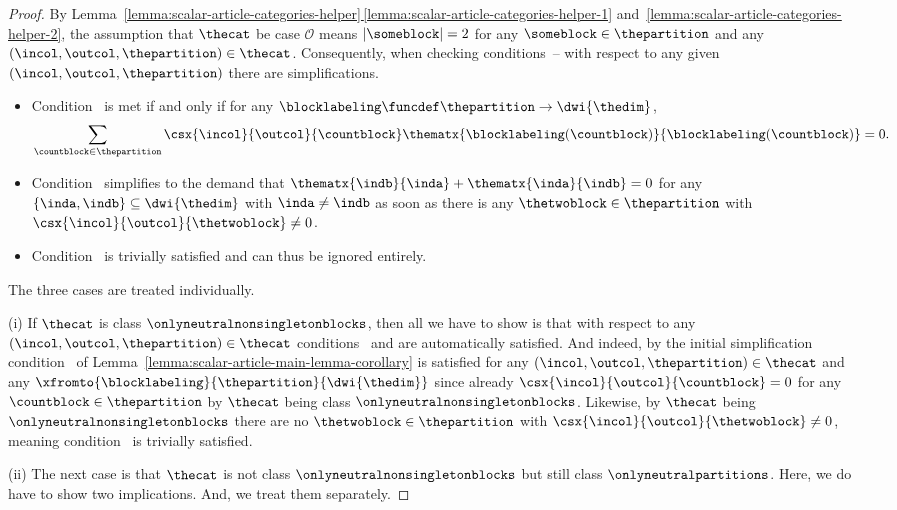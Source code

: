 \documentclass[pdftex]{sigma}
\numberwithin{equation}{section}
\begin{document}
{\begin{proof}
  By Lem\-ma~\hyperref[lemma:scalar-article-categories-helper-1]{\ref*{lemma:scalar-article-categories-helper}\,\ref*{lemma:scalar-article-categories-helper-1}} and~\ref{lemma:scalar-article-categories-helper-2}, the assumption that $\thecat$ be case $\mathcal{O}$  means $|\someblock|=2$ for any $\someblock\in\thepartition$ and any $(\incol,\outcol,\thepartition)\in\thecat$. Consequently, when checking  conditions~\conditionone{}--\conditionthree{} with respect to any given $(\incol,\outcol,\thepartition)$ there are simplifications.
  \begin{itemize}
  \item Condition~\conditionone{} is met if and only if for any $\blocklabeling\funcdef\thepartition\to\dwi{\thedim}$,
                \[
                \sum_{\countblock\in\thepartition}\csx{\incol}{\outcol}{\countblock}
        \thematx{\blocklabeling(\countblock)}{\blocklabeling(\countblock)}=0.
      \]
\item    Condition~\conditiontwo{} simplifies to the demand that $\thematx{\indb}{\inda}+\thematx{\inda}{\indb}=0$ for any $\{\inda,\indb\}\subseteq \dwi{\thedim}$ with $\inda\neq \indb$ as soon as there is any $\thetwoblock\in \thepartition$ with $\csx{\incol}{\outcol}{\thetwoblock}\neq 0$.
\item    Condition~\conditionthree{}  is trivially satisfied  and can thus be ignored entirely.
  \end{itemize}
  The three cases are treated individually.

  (i)
  If $\thecat$ is class $\onlyneutralnonsingletonblocks$, then all we have to show is that with respect to any $(\incol,\outcol,\thepartition)\in\thecat$ con\-di\-tions~\conditionone{} and \conditiontwo{} are automatically satisfied. And indeed, by the initial simplification condition~\conditionone{} of Lem\-ma~\ref{lemma:scalar-article-main-lemma-corollary} is satisfied for any $(\incol,\outcol,\thepartition)\in\thecat$ and any $\xfromto{\blocklabeling}{\thepartition}{\dwi{\thedim}}$ since already $\csx{\incol}{\outcol}{\countblock}=0$ for any $\countblock\in\thepartition$ by $\thecat$ being class $\onlyneutralnonsingletonblocks$. Likewise, by $\thecat$ being $\onlyneutralnonsingletonblocks$ there are no $\thetwoblock\in\thepartition$ with $\csx{\incol}{\outcol}{\thetwoblock}\neq 0$, meaning  con\-di\-tion~\conditiontwo{} is trivially satisfied.

  (ii)
  The next case is that $\thecat$ is not class $\onlyneutralnonsingletonblocks$ but still class $\onlyneutralpartitions$. Here, we do have to show two implications. And, we  treat them separately.


\end{proof}}
\end{document}
